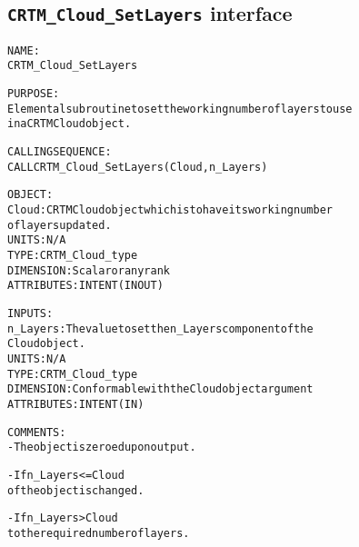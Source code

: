 \subsection{\texttt{CRTM\_Cloud\_SetLayers} interface}
  \label{sec:CRTM_Cloud_SetLayers_interface}
  \begin{alltt}
 
  NAME:
        CRTM_Cloud_SetLayers
 
  PURPOSE:
        Elemental subroutine to set the working number of layers to use
        in a CRTM Cloud object.
 
  CALLING SEQUENCE:
       CALL CRTM_Cloud_SetLayers( Cloud, n_Layers )
 
  OBJECT:
        Cloud:        CRTM Cloud object which is to have its working number
                      of layers updated.
                      UNITS:      N/A
                      TYPE:       CRTM_Cloud_type
                      DIMENSION:  Scalar or any rank
                      ATTRIBUTES: INTENT(IN OUT)
 
  INPUTS:
        n_Layers:     The value to set the n_Layers component of the
                      Cloud object.
                      UNITS:      N/A
                      TYPE:       CRTM_Cloud_type
                      DIMENSION:  Conformable with the Cloud object argument
                      ATTRIBUTES: INTENT(IN)
 
  COMMENTS:
        - The object is zeroed upon output.
 
        - If n_Layers <= Cloud%Max_Layers, then only the dimension value
          of the object is changed.
 
        - If n_Layers > Cloud%Max_Layers, then the object is reallocated
          to the required number of layers.
 
  \end{alltt}
